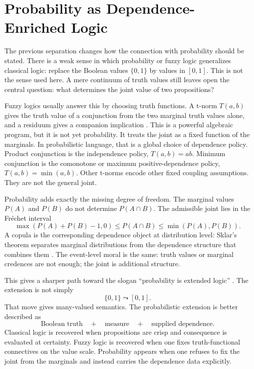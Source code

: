 \section{Probability as Dependence-Enriched Logic}
\label{sec:probability-dependence-logic}

The previous separation changes how the connection with probability
should be stated.  There is a weak sense in which probability or fuzzy
logic generalizes classical logic: replace the Boolean values
$\{0,1\}$ by values in $[0,1]$.  This is not the sense used here.  A
mere continuum of truth values still leaves open the central question:
what determines the joint value of two propositions?

Fuzzy logics usually answer this by choosing truth functions.  A t-norm
$T(a,b)$ gives the truth value of a conjunction from the two marginal
truth values alone, and a residuum gives a companion implication
\cite{hajek1998,klement2000,cintula2011}.  This is a powerful algebraic
program, but it is not yet probability.  It treats the joint as a fixed
function of the marginals.  In probabilistic language, that is a global
choice of dependence policy.  Product conjunction is the independence
policy, $T(a,b)=ab$.  Minimum conjunction is the comonotone or maximum
positive-dependence policy, $T(a,b)=\min(a,b)$.  Other t-norms encode
other fixed coupling assumptions.  They are not the general joint.

Probability adds exactly the missing degree of freedom.  The marginal
values $P(A)$ and $P(B)$ do not determine $P(A\cap B)$.  The admissible
joint lies in the Fr\'echet interval
\[
  \max(P(A)+P(B)-1,0)\le P(A\cap B)\le \min(P(A),P(B)).
\]
A copula is the corresponding dependence object at distribution level:
Sklar's theorem separates marginal distributions from the dependence
structure that combines them \cite{nelsen2006}.  The event-level moral is
the same: truth values or marginal credences are not enough; the joint is
additional structure.

This gives a sharper path toward the slogan ``probability is extended
logic'' \cite{cox1961,jaynes2003}.  The extension is not simply
\[
  \{0,1\}\leadsto[0,1].
\]
That move gives many-valued semantics.  The probabilistic extension is
better described as
\[
  \text{Boolean truth} \quad+\quad \text{measure} \quad+\quad
  \text{supplied dependence}.
\]
Classical logic is recovered when propositions are crisp and consequence
is evaluated at certainty.  Fuzzy logic is recovered when one fixes
truth-functional connectives on the value scale.  Probability appears
when one refuses to fix the joint from the marginals and instead carries
the dependence data explicitly.


